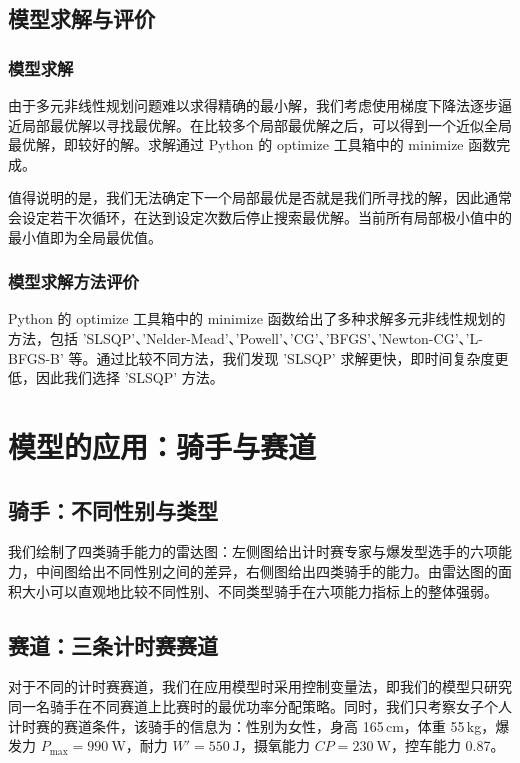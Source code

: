 \documentclass[11pt,a4paper]{ctexart}
\begin{document}
\subsection{模型求解与评价}

\subsubsection{模型求解}

由于多元非线性规划问题难以求得精确的最小解，我们考虑使用梯度下降法逐步逼近局部最优解以寻找最优解。在比较多个局部最优解之后，可以得到一个近似全局最优解，即较好的解。求解通过 Python 的 optimize 工具箱中的 minimize 函数完成。

值得说明的是，我们无法确定下一个局部最优是否就是我们所寻找的解，因此通常会设定若干次循环，在达到设定次数后停止搜索最优解。当前所有局部极小值中的最小值即为全局最优值。

\subsubsection{模型求解方法评价}

Python 的 optimize 工具箱中的 minimize 函数给出了多种求解多元非线性规划的方法，包括 'SLSQP'、'Nelder-Mead'、'Powell'、'CG'、'BFGS'、'Newton-CG'、'L-BFGS-B' 等。通过比较不同方法，我们发现 'SLSQP' 求解更快，即时间复杂度更低，因此我们选择 'SLSQP' 方法。

\section{模型的应用：骑手与赛道}

\subsection{骑手：不同性别与类型}

我们绘制了四类骑手能力的雷达图：左侧图给出计时赛专家与爆发型选手的六项能力，中间图给出不同性别之间的差异，右侧图给出四类骑手的能力。由雷达图的面积大小可以直观地比较不同性别、不同类型骑手在六项能力指标上的整体强弱。

\subsection{赛道：三条计时赛赛道}

对于不同的计时赛赛道，我们在应用模型时采用控制变量法，即我们的模型只研究同一名骑手在不同赛道上比赛时的最优功率分配策略。同时，我们只考察女子个人计时赛的赛道条件，该骑手的信息为：性别为女性，身高 165\,cm，体重 55\,kg，爆发力 $P_{\max}=990\ \mathrm{W}$，耐力 $W'=550\ \mathrm{J}$，摄氧能力 $CP=230\ \mathrm{W}$，控车能力 0.87。
\end{document}

